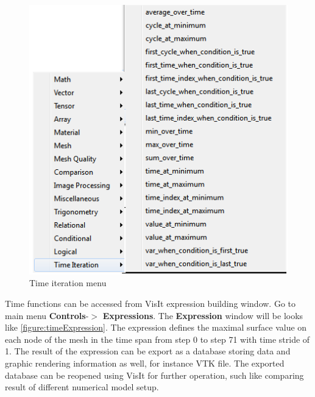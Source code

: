 \documentclass[12pt]{report}
\begin{document}
\begin{figure}
\begin{center}
\includegraphics{timeFunctions}
\caption{Time iteration menu }
\label{figure:timeFunctions}
\end{center}
\end{figure} 

Time functions can be accessed from VisIt expression building window. Go to main menu {\bf Controls}-$>$ {\bf Expressions}.
The {\bf Expression} window will be looks like  \ref{figure:timeExpression}. The expression defines the maximal surface value
on each node of the mesh in the time span from step 0 to  step 71 with time stride of 1. The result of the expression can be
export as a database storing data and graphic rendering information as well, for instance VTK file. The exported database can
be reopened using VisIt for further operation, such like comparing result of different numerical model setup. 
\end{document}
